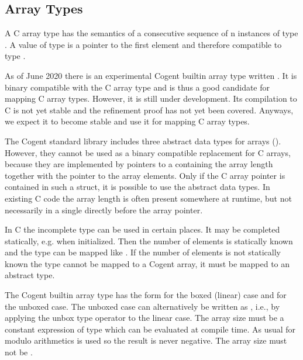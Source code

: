 \subsection{Array Types}
\label{design-types-array}

A C array type  has the semantics of a consecutive sequence of n instances of type . A value
of type  is a pointer to the first element and therefore compatible to type .


As of June 2020 there is an experimental Cogent builtin array type written . It is binary compatible 
with the C array type  and is thus a good candidate for mapping C array types. However, it
is still under development. Its compilation to C is not yet stable and the refinement proof has
not yet been covered. Anyways, we expect it to become stable and use it for
mapping C array types.

The Cogent standard library includes three abstract data types for arrays (). 
However, they cannot be used as a binary compatible replacement for C arrays, because they are implemented by 
pointers to a  containing the array length together with the pointer to the array elements. 
Only if the C array pointer is contained in such a struct, it is possible to use the abstract data types. 
In existing C code the array length is often present somewhere at runtime, but not necessarily in a single 
directly before the array pointer.

In C the incomplete type  can be used in certain places. It may be completed statically, e.g. 
when initialized. Then the number of elements is statically known and the type can be mapped like .
If the number of elements is not statically known the type cannot be mapped to a Cogent array, it must be mapped 
to an abstract type.

The Cogent builtin array type has the form  for the boxed (linear) case and  for the unboxed
case. The unboxed case can alternatively be written as , i.e., by applying the unbox type
operator to the linear case. The array size  must be a constant expression of type  which can be
evaluated at compile time. As usual for  modulo arithmetics is used so the result is never negative.
The array size must not be .

